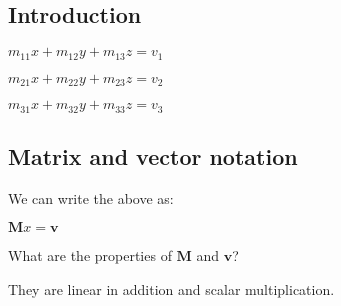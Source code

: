 
\subsection{Introduction}

\(m_{11}x+m_{12}y+m_{13}z=v_1\)

\(m_{21}x+m_{22}y+m_{23}z=v_2\)

\(m_{31}x+m_{32}y+m_{33}z=v_3\)


\subsection{Matrix and vector notation}

We can write the above as:

\(\mathbf{M}x=\mathbf{v}\)

What are the properties of \(\mathbf{M}\) and \(\mathbf{v}\)?

They are linear in addition and scalar multiplication.
